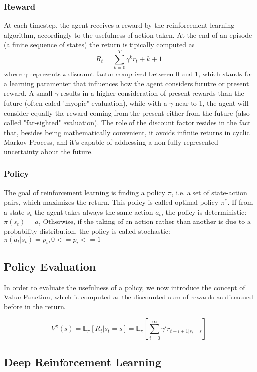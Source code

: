 \subsubsection{Reward}
At each timestep, the agent receives a reward by the reinforcement learning algorithm, accordingly to the usefulness of action taken.
At the end of an episode (a finite sequence of states) the return is tipically computed as \[R_t = \sum^{T}_{k=0}\gamma^k r_t + k +1\] where \(\gamma\) represents a discount factor comprised between 0 and 1, which stands for a learning paramenter that influences how the agent considers furutre or present reward. A small \(\gamma\) results in a higher consideration of present rewards than the future (often caled "myopic" evaluation), while with a \(\gamma\) near to 1, the agent will consider equally the reward coming from the present either from the future (also called "far-sighted" evaluation). The role of the discount factor resides in the fact that, besides being mathematically convenient, it avoids infinite returns in cyclic Markov Process, and it's capable of addressing a non-fully represented uncertainty about the future.

\subsubsection{Policy}
The goal of reinforcement learning is finding a policy \(\pi\), i.e. a set of state-action pairs, which maximizes the return. This policy is called optimal policy \(\pi^*\).
If from a state \(s_t\) the agent takes always the same action \(a_t\), the policy is deterministic:
\(\pi(s_t) = a_t\)
Otherwise, if the taking of an action rather than another is due to a probability distribution, the policy is called stochastic:
\(\pi(a_t|s_t) = p_i, 0<=p_i<=1\)

\subsection{Policy Evaluation}
In order to evaluate the usefulness of a policy, we now introduce the concept of Value Function, which is computed as the discounted sum of rewards as discussed before in the return.

\[V^\pi(s) = \mathbb{E}_\pi{\left[R_t|s_t=s\right]}= \mathbb{E}_\pi\left[\sum^{\infty}_{i=0}\gamma^ir_{t+i+1|s_t=s}\right]\]
\subsection{Deep Reinforcement Learning}

